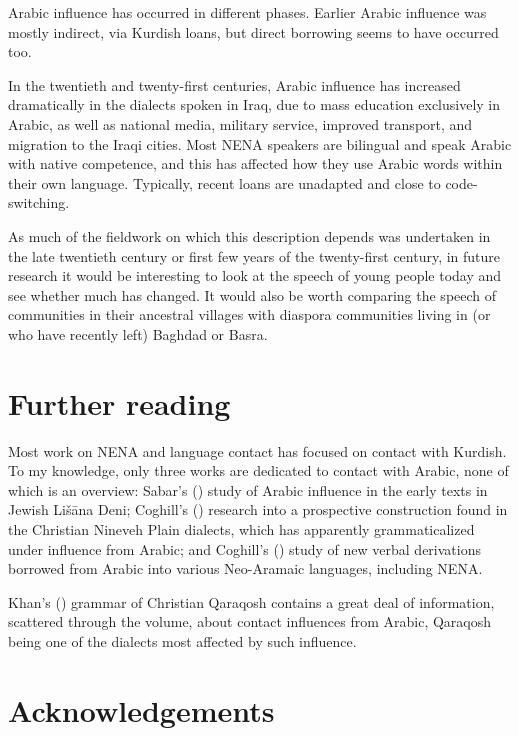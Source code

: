 \documentclass[output=paper]{langsci/langscibook}
\begin{document}
Arabic influence has occurred in different phases. Earlier Arabic influence was mostly indirect, via Kurdish loans, but direct borrowing seems to have occurred too.

In the twentieth and twenty-first centuries, Arabic influence has increased dramatically in the dialects spoken in Iraq, due to mass education exclusively in Arabic, as well as national media, military service, improved transport, and migration to the Iraqi cities. Most NENA speakers are bilingual and speak Arabic with native competence, and this has affected how they use Arabic words within their own language. Typically, recent loans are unadapted and close to code-switching.

As much of the fieldwork on which this description depends was undertaken in the late twentieth century or first few years of the twenty-first century, in future research it would be interesting to look at the speech of young people today and see whether much has changed. It would also be worth comparing the speech of communities in their ancestral villages with diaspora communities living in (or who have recently left) Baghdad or Basra.

\section*{Further reading}

Most work on NENA and language contact has focused on contact with Kurdish. To my knowledge, only three works are dedicated to contact with Arabic, none of which is an overview: Sabar's (\citeyear{Sabar1984}) study of Arabic influence in the early texts in Jewish Lišāna Deni; Coghill’s (\citeyear{Coghill2010,Coghill2012}) research into a prospective construction found in the Christian Nineveh Plain dialects, which has apparently grammaticalized under influence from Arabic; and Coghill's (\citeyear{Coghill2015}) study of new verbal derivations borrowed from Arabic into various Neo-Aramaic languages, including NENA.

Khan's (\citeyear{Khan2002}) grammar of Christian Qaraqosh contains a great deal of information, scattered through the volume, about contact influences from Arabic, Qaraqosh being one of the dialects most affected by such influence.

\section*{Acknowledgements}
\end{document}
